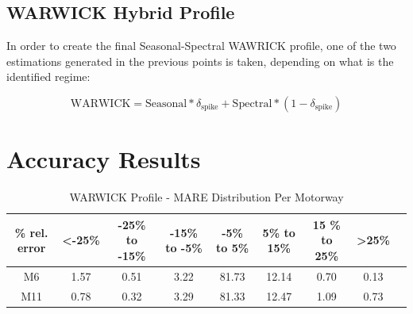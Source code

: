 \documentclass[a4paper, 10pt, conference]{ieeeconf}      %
\begin{document}
\subsection{WARWICK Hybrid Profile}
In order to create the final Seasonal-Spectral WAWRICK profile, one of the two estimations generated in the previous points is taken, depending on what is the identified regime: 

\begin{equation}
\textrm{WARWICK} = \textrm{Seasonal} * \delta_{\textrm{spike}} + \textrm{Spectral} * (1 - \delta_{\textrm{spike}})
\end{equation}

\section{Accuracy Results}
\begin{table}[bp]
	\caption{WARWICK Profile - MARE Distribution Per Motorway}
	\centering
	\begin{center}	
		\begin{tabular}{|C|C|C|C|C|C|C|C|C|}
			\hline
			\textbf{\% rel. error}&{\textless -25\%}&{-25\%\textbf{ to }-15\%}&{-15\%\textbf{ to }-5\%}&{-5\%\textbf{ to }5\%}&{5\%\textbf{ to }15\%}&{15 \%\textbf{ to }25\%}&{\textgreater 25\%}\\
			\hline
			M6& 1.57& 0.51& 3.22& 81.73& 12.14& 0.70& 0.13\\
			\hline
			M11& 0.78& 0.32& 3.29& 81.33& 12.47& 1.09& 0.73\\
			\hline
		\end{tabular}
		\label{mapeglobal}
	\end{center}
\end{table}
\end{document}
